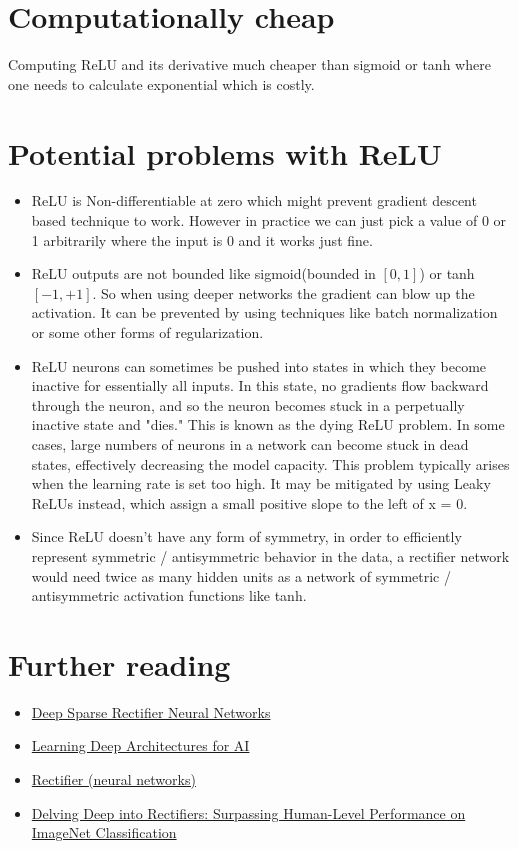\documentclass{article}
\begin{document}
\section*{Computationally cheap}
Computing ReLU and its derivative much cheaper than sigmoid or tanh where one needs to calculate exponential which is costly.

\section*{Potential problems with ReLU}
\begin{itemize}
    \item ReLU is Non-differentiable at zero which might prevent gradient descent based technique to work. However in practice we can just pick a value of 0 or 1 arbitrarily where the input is 0 and it works just fine.
    \item ReLU outputs are not bounded like sigmoid(bounded in $[0, 1]$) or tanh $[-1, +1]$. So when using deeper networks the gradient can blow up the activation. It can be prevented by using techniques like batch normalization or some other forms of regularization.
    \item ReLU neurons can sometimes be pushed into states in which they become inactive for essentially all inputs. In this state, no gradients flow backward through the neuron, and so the neuron becomes stuck in a perpetually inactive state and "dies." This is known as the dying ReLU problem. In some cases, large numbers of neurons in a network can become stuck in dead states, effectively decreasing the model capacity. This problem typically arises when the learning rate is set too high. It may be mitigated by using Leaky ReLUs instead, which assign a small positive slope to the left of x = 0.
    \item Since ReLU doesn't have any form of symmetry, in order to efficiently represent symmetric / antisymmetric behavior in the data, a rectifier network would need twice as many hidden units as a network of symmetric / antisymmetric activation functions like tanh.
\end{itemize}

\section*{Further reading}
\begin{itemize}
    \item \href{http://proceedings.mlr.press/v15/glorot11a/glorot11a.pdf}{Deep Sparse Rectifier Neural Networks}
    \item \href{https://www.iro.umontreal.ca/~lisa/pointeurs/TR1312.pdf}{Learning Deep Architectures for AI}
    \item \href{https://en.wikipedia.org/wiki/Rectifier_(neural_networks)}{Rectifier (neural networks)}
    \item \href{https://arxiv.org/pdf/1502.01852.pdf}{Delving Deep into Rectifiers: Surpassing Human-Level Performance on ImageNet Classification}
\end{itemize}
\end{document}
